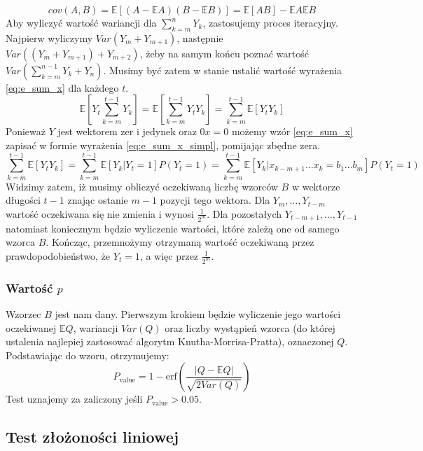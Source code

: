 \begin{equation}
    \label{eq:cov_def}
     cov(A, B) = \mathbb{E}[(A -\mathbb{E}A)(B - \mathbb{E}B)] = \mathbb{E}[AB] - \mathbb{E}A\mathbb{E}B
\end{equation}
Aby wyliczyć wartość wariancji dla $\sum_{k=m}^n Y_k$, zastosujemy proces iteracyjny. Najpierw wyliczymy $Var(Y_m + Y_{m+1})$, następnie $Var((Y_m + Y_{m+1}) + Y_{m+2})$, żeby na samym końcu poznać wartość $Var(\sum_{k=m}^{n-1} Y_k+ Y_{n})$. Musimy być zatem w stanie ustalić wartość wyrażenia \ref{eq:e_sum_x} dla każdego $t$.
\begin{equation}
    \label{eq:e_sum_x}
    \mathbb{E}\left[Y_t\sum_{k=m}^{t-1}Y_k\right] = \mathbb{E}\left[\sum_{k=m}^{t-1}Y_t Y_k\right] = 
    \sum_{k=m}^{t-1}\mathbb{E}\left[Y_t Y_k\right]
\end{equation}
Ponieważ $Y$ jest wektorem zer i jedynek oraz $0x = 0$ możemy wzór \ref{eq:e_sum_x} zapisać w formie wyrażenia \ref{eq:e_sum_x_simpl}, pomijając zbędne zera.
\begin{equation}
    \label{eq:e_sum_x_simpl}
    \sum_{k=m}^{t-1}\mathbb{E}\left[Y_t Y_k\right] =
    \sum_{k=m}^{t-1}\mathbb{E}\left[Y_k | Y_t = 1\right] P(Y_t = 1) = 
    \sum_{k=m}^{t-1}\mathbb{E}\left[Y_k | x_{k-m+1}\dots x_k = b_1\dots b_m \right]P(Y_t = 1)
\end{equation}
Widzimy zatem, iż musimy obliczyć oczekiwaną liczbę wzorców $B$ w wektorze długości $t-1$ znając ostanie $m-1$ pozycji tego wektora. Dla $Y_m, \dots, Y_{t-m}$ wartość oczekiwana się nie zmienia i wynosi $\frac{1}{2^m}$. Dla pozostałych $Y_{t-m+1}, \dots, Y_{t-1}$ natomiast koniecznym będzie wyliczenie wartości, które zależą one od samego wzorca $B$. Kończąc, przemnożymy otrzymaną wartość oczekiwaną przez prawdopodobieństwo, że $Y_t = 1$, a więc przez $\frac{1}{2^m}$.
\subsubsection{Wartość $p$}
Wzorzec $B$ jest nam dany. Pierwszym krokiem będzie wyliczenie jego wartości oczekiwanej $\mathbb{E}Q$, wariancji $Var(Q)$ oraz liczby wystąpień wzorca (do której ustalenia najlepiej zastosować algorytm Knutha-Morrisa-Pratta), oznaczonej $Q$. Podstawiając do wzoru, otrzymujemy:
\begin{equation}
    P_{\textrm{value}} = 1 - \textrm{erf}\left(\frac{|Q - \mathbb{E}Q|}{\sqrt{2Var(Q)}} \right)
\end{equation}
Test uznajemy za zaliczony jeśli $P_{\textrm{value}} > 0.05$.
\subsection{Test złożoności liniowej}
